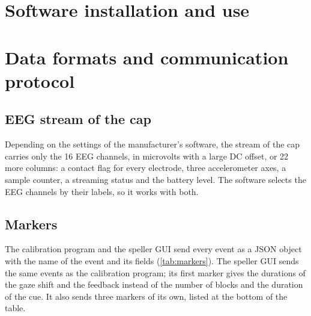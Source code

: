 
\chapter{Software installation and use}
\label{app:software}

\chapter{Data formats and communication protocol}
\label{app:protocol}

\section*{EEG stream of the cap}

Depending on the settings of the manufacturer's software, the stream of the cap carries
only the 16 \ac{EEG} channels, in microvolts with a large DC offset, or 22 more columns:
a contact flag for every electrode, three accelerometer axes, a sample counter, a
streaming status and the battery level. The software selects the \ac{EEG} channels by
their labels, so it works with both.

\section*{Markers}

The calibration program and the speller \ac{GUI} send every event as a \ac{JSON}
object with the name of the event and its fields (\cref{tab:markers}). The speller
\ac{GUI} sends the same events as the calibration program; its first marker gives the
durations of the gaze shift and the feedback instead of the number of blocks and the
duration of the cue. It also sends three markers of its own, listed at the bottom of
the table.

